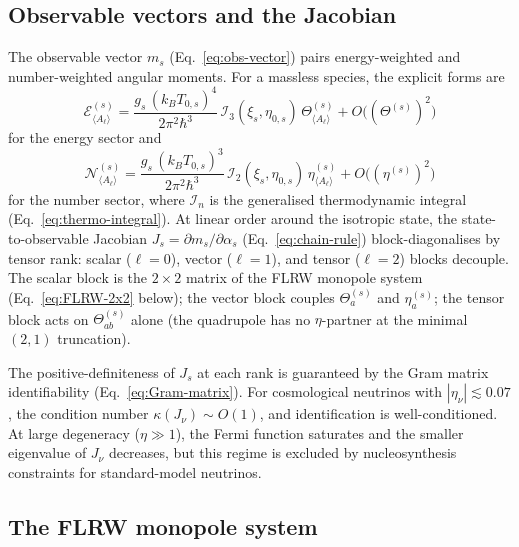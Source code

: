 \subsection{Observable vectors and the Jacobian}
\label{sec:obs-jacobian}

The observable vector $m_s$
(Eq.~\ref{eq:obs-vector}) pairs energy-weighted and
number-weighted angular moments.  For a massless
species, the explicit forms are
\begin{equation}\label{eq:E-moment-explicit}
\mathcal{E}^{(s)}_{\langle A_\ell \rangle}
= \frac{g_s\,(k_B T_{0,s})^4}{2\pi^2 \hbar^3}\,
  \mathcal{I}_3(\xi_s, \eta_{0,s})\,
  \Theta^{(s)}_{\langle A_\ell \rangle}
  + O\big((\Theta^{(s)})^2\big)
\end{equation}
for the energy sector and
\begin{equation}\label{eq:N-moment-explicit}
\mathcal{N}^{(s)}_{\langle A_\ell \rangle}
= \frac{g_s\,(k_B T_{0,s})^3}{2\pi^2 \hbar^3}\,
  \mathcal{I}_2(\xi_s, \eta_{0,s})\,
  \eta^{(s)}_{\langle A_\ell \rangle}
  + O\big((\eta^{(s)})^2\big)
\end{equation}
for the number sector, where $\mathcal{I}_n$ is the
generalised thermodynamic integral
(Eq.~\ref{eq:thermo-integral}).  At linear order around
the isotropic state, the state-to-observable Jacobian
$J_s = \partial m_s / \partial \alpha_s$
(Eq.~\ref{eq:chain-rule}) block-diagonalises by
tensor rank: scalar ($\ell = 0$), vector ($\ell = 1$),
and tensor ($\ell = 2$) blocks decouple.  The scalar
block is the $2 \times 2$ matrix of the FLRW monopole
system (Eq.~\ref{eq:FLRW-2x2} below); the vector
block couples $\Theta^{(s)}_a$ and $\eta^{(s)}_a$;
the tensor block acts on $\Theta^{(s)}_{ab}$ alone
(the quadrupole has no $\eta$-partner at the minimal
$(2,1)$ truncation).

The positive-definiteness of $J_s$ at each rank is
guaranteed by the Gram matrix identifiability
(Eq.~\ref{eq:Gram-matrix}).  For cosmological
neutrinos with $|\eta_\nu| \lesssim 0.07$, the
condition number $\kappa(J_{\nu}) \sim O(1)$, and
identification is well-conditioned.  At large
degeneracy ($\eta \gg 1$), the Fermi function
saturates and the smaller eigenvalue of $J_\nu$
decreases, but this regime is excluded by
nucleosynthesis constraints for standard-model
neutrinos.


\subsection{The FLRW monopole system}
\label{sec:FLRW-monopole-ch5}

